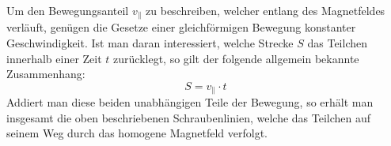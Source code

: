 Um den Bewegungsanteil \(v_\parallel\) zu beschreiben, welcher entlang des Magnetfeldes verl\"auft, gen\"ugen die Gesetze einer
gleichf\"ormigen Bewegung konstanter Geschwindigkeit. Ist man daran interessiert, welche Strecke \(S\) das Teilchen innerhalb einer
Zeit \(t\) zur\"ucklegt, so gilt der folgende allgemein bekannte Zusammenhang:
\begin{equation}
  \label{eq:s_parallel}
  S = v_\parallel \cdot t
\end{equation}
Addiert man diese beiden unabh\"angigen Teile der Bewegung, so erh\"alt man insgesamt die oben beschriebenen Schraubenlinien, welche
das Teilchen auf seinem Weg durch das homogene Magnetfeld verfolgt.
